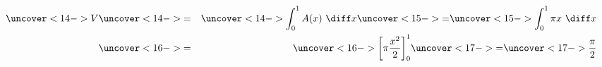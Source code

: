 \begin{frame}
\begin{example}[Example 2, p. 356]
\begin{columns}[c]
\begin{center}
{\includegraphics[height=3.5cm]{volumes/pictures/06-02-ex2d.pdf} %
}%
%
%
%
\end{center}
\abovedisplayskip=0pt
\belowdisplayskip=0pt
\begin{eqnarray*}
\uncover<14->{%
V%
}%
& \uncover<14->{ = } &%
\uncover<14->{%
\int_0^1 A(x) \ \diff x%
}%
 \uncover<15->{ = } %
\uncover<15->{%
\int_0^1 \pi x \ \diff x%
}\\%
& \uncover<16->{ = } &%
\uncover<16->{%
\left[ \pi \frac{x^2}{2}\right]_0^1%
}%
 \uncover<17->{ = } %
\uncover<17->{%
\frac{\pi}{2}%
}%
\end{eqnarray*}
\end{columns}
\end{example}
\end{frame}
